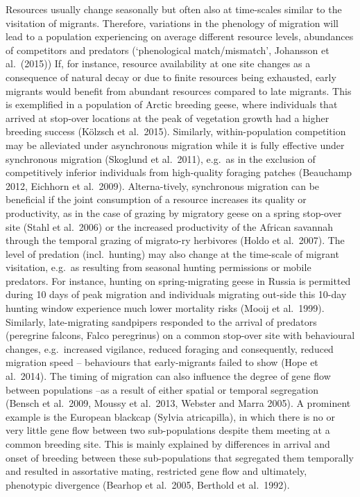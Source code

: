 \documentclass[
]{book}
\begin{document}
Resources usually change seasonally but often also at time-scales similar to the visitation of migrants. Therefore, variations in the phenology of migration will lead to a population experiencing on average different resource levels, abundances of competitors and predators (`phenological match/mismatch', Johansson et al.~(2015)) If, for instance, resource availability at one site changes as a consequence of natural decay or due to finite resources being exhausted, early migrants would benefit from abundant resources compared to late migrants. This is exemplified in a population of Arctic breeding geese, where individuals that arrived at stop-over locations at the peak of vegetation growth had a higher breeding success (Kölzsch et al.~2015).
Similarly, within-population competition may be alleviated under asynchronous migration while it is fully effective under synchronous migration (Skoglund et al.~2011), e.g.~as in the exclusion of competitively inferior individuals from high-quality foraging patches (Beauchamp 2012, Eichhorn et al.~2009). Alterna-tively, synchronous migration can be beneficial if the joint consumption of a resource increases its quality or productivity, as in the case of grazing by migratory geese on a spring stop-over site (Stahl et al.~2006) or the increased productivity of the African savannah through the temporal grazing of migrato-ry herbivores (Holdo et al.~2007).
The level of predation (incl.~hunting) may also change at the time-scale of migrant visitation, e.g.~as resulting from seasonal hunting permissions or mobile predators. For instance, hunting on spring-migrating geese in Russia is permitted during 10 days of peak migration and individuals migrating out-side this 10-day hunting window experience much lower mortality risks (Mooij et al.~1999). Similarly, late-migrating sandpipers responded to the arrival of predators (peregrine falcons, Falco peregrinus) on a common stop-over site with behavioural changes, e.g.~increased vigilance, reduced foraging and consequently, reduced migration speed -- behaviours that early-migrants failed to show (Hope et al.~2014).
The timing of migration can also influence the degree of gene flow between populations --as a result of either spatial or temporal segregation (Bensch et al.~2009, Moussy et al.~2013, Webster and Marra 2005). A prominent example is the European blackcap (Sylvia atricapilla), in which there is no or very little gene flow between two sub-populations despite them meeting at a common breeding site. This is mainly explained by differences in arrival and onset of breeding between these sub-populations that segregated them temporally and resulted in assortative mating, restricted gene flow and ultimately, phenotypic divergence (Bearhop et al.~2005, Berthold et al.~1992).
\end{document}
